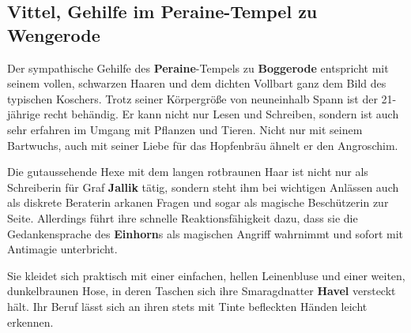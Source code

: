 
\subsection[Vittel, Gehilfe im Peraine-Tempel]{Vittel, Gehilfe im Peraine-Tempel zu Wengerode}
Der sympathische Gehilfe des \textbf{Peraine}-Tempels zu \textbf{Boggerode} entspricht mit seinem vollen, schwarzen Haaren und dem dichten Vollbart ganz dem Bild des typischen Koschers.
Trotz seiner Körpergröße von neuneinhalb Spann ist der 21-jährige recht behändig.
Er kann nicht nur Lesen und Schreiben, sondern ist auch sehr erfahren im Umgang mit Pflanzen und Tieren.
Nicht nur mit seinem Bartwuchs, auch mit seiner Liebe für das Hopfenbräu ähnelt er den Angroschim.


Die gutaussehende Hexe mit dem langen rotbraunen Haar ist nicht nur als Schreiberin für Graf \textbf{Jallik} tätig, sondern steht ihm bei wichtigen Anlässen auch als diskrete Beraterin arkanen Fragen und sogar als magische Beschützerin zur Seite. Allerdings führt ihre schnelle Reaktionsfähigkeit dazu, dass sie die Gedankensprache des \textbf{Einhorn}s als magischen Angriff wahrnimmt und sofort mit Antimagie unterbricht.

Sie kleidet sich praktisch mit einer einfachen, hellen Leinenbluse und einer weiten, dunkelbraunen Hose, in deren Taschen sich ihre Smaragdnatter \textbf{Havel} versteckt hält. Ihr Beruf lässt sich an ihren stets mit Tinte befleckten Händen leicht erkennen.

\spaltenende